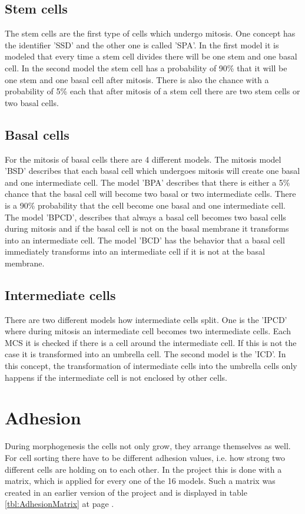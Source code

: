 \subsection{Stem cells}
The stem cells are the first type of cells which undergo mitosis. One concept has the identifier 'SSD' and the other one is called 'SPA'. In the first model it is modeled that every time a stem cell divides there will be one stem and one basal cell. In the second model the stem cell has a probability of 90\% that it will be one stem and one basal cell after mitosis. There is also the chance with a probability of 5\% each that after mitosis of a stem cell there are two stem cells or two basal cells.
\subsection{Basal cells}
For the mitosis of basal cells there are 4 different models. The mitosis model 'BSD' describes that each basal cell which undergoes mitosis will create one basal and one intermediate cell. The model 'BPA' describes that there is either a 5\% chance that the basal cell will become two basal or two intermediate cells. There is a 90\% probability that the cell become one basal and one intermediate cell. The model 'BPCD', describes that always a basal cell becomes two basal cells during mitosis and if the basal cell is not on the basal membrane it transforms into an intermediate cell. The model 'BCD' has the behavior that a basal cell immediately transforms into an intermediate cell if it is not at the basal membrane.\newline
\subsection{Intermediate cells}
There are two different models how intermediate cells split. One is the 'IPCD' where during mitosis an intermediate cell becomes two intermediate cells. Each \ac{MCS} it is checked if there is a cell around the intermediate cell. If this is not the case it is transformed into an umbrella cell. The second model is the 'ICD'. In this concept, the transformation of intermediate cells into the umbrella cells only happens if the intermediate cell is not enclosed by other cells. \newline


\section{Adhesion}\label{sec:Adhesion}
During morphogenesis the cells not only grow, they arrange themselves as well. For cell sorting there have to be different adhesion values, i.e. how strong two different cells are holding on to each other. In the project this is done with a matrix, which is applied for every one of the 16 models. Such a matrix was created in an earlier version of the project \cite{Torelli2017} and is displayed in table \ref{tbl:AdhesionMatrix} at page \pageref{tbl:AdhesionMatrix}.


